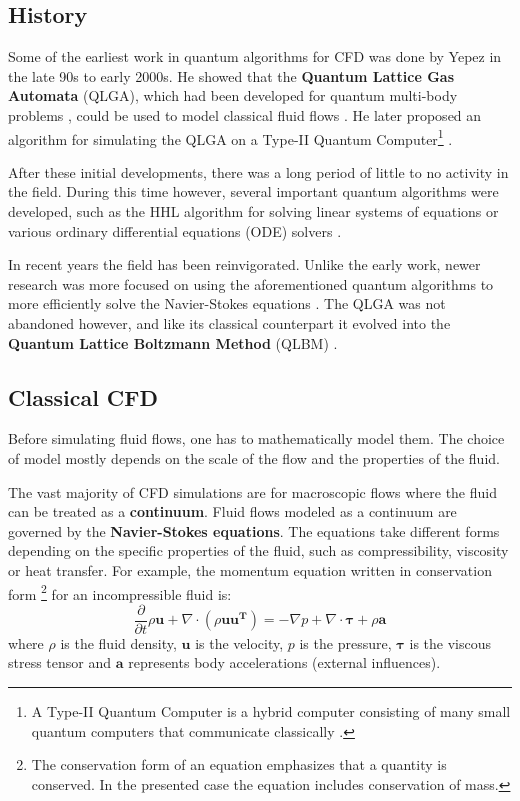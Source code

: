 \documentclass[conference]{IEEEtran}
\begin{document}
\subsection{History}
Some of the earliest work in quantum algorithms for CFD was done by Yepez in the late 90s to early 2000s.
He showed that the \textbf{Quantum Lattice Gas Automata} (QLGA), which had been developed for quantum multi-body problems \cite{boghosian1997gas}, could be used to model classical fluid flows \cite{yepez1998lattice}.
He later proposed an algorithm for simulating the QLGA on a Type-II Quantum Computer\footnote{A Type-II Quantum Computer is a hybrid computer consisting of many small quantum computers that communicate classically \cite{yepez2001type}.} \cite{yepez2001lattice}.

After these initial developments, there was a long period of little to no activity in the field.
During this time however, several important quantum algorithms were developed, such as the HHL algorithm for solving linear systems of equations \cite{harrow2009quantum} or various ordinary differential equations (ODE) solvers \cite{kacewicz2006almost,leyton2008quantum}.

In recent years the field has been reinvigorated.
Unlike the early work, newer research was more focused on using the aforementioned quantum algorithms to more efficiently solve the Navier-Stokes equations \cite{gaitan2020finding, jaksch2023variational}.
The QLGA was not abandoned however, and like its classical counterpart it evolved into the \textbf{Quantum Lattice Boltzmann Method} (QLBM) \cite{budinski2021quantum, itani2024quantum}.

\subsection{Classical CFD}

Before simulating fluid flows, one has to mathematically model them. The choice of model mostly depends on the scale of the flow and the properties of the fluid.

The vast majority of CFD simulations are for macroscopic flows where the fluid can be treated as a \textbf{continuum}.
Fluid flows modeled as a continuum are governed by the \textbf{Navier-Stokes equations}. The equations take different forms depending on the specific properties of the fluid, such as compressibility, viscosity or heat transfer.
For example, the momentum equation written in conservation form \footnote{The conservation form of an equation emphasizes that a quantity is conserved. In the presented case the equation includes conservation of mass.} for an incompressible fluid is:
\begin{displaymath}
    \label{eq:ns}
    \frac{\partial}{\partial t} \rho \pmb{u} + \nabla \cdot (\rho \pmb{u} \pmb{u^T}) = -\nabla p + \nabla \cdot \pmb{\tau} + \rho \pmb{a}
\end{displaymath}
where $\rho$ is the fluid density, $\pmb{u}$ is the velocity, $p$ is the pressure, $\pmb{\tau}$ is the viscous stress tensor and $\pmb{a}$ represents body accelerations (external influences).
\end{document}
